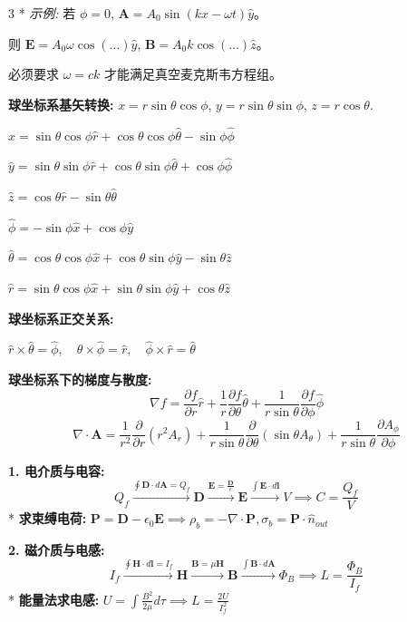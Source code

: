\documentclass[10pt,a4paper,landscape,utf8]{ctexart}
\newcommand{\p}{\partial}
\newcommand{\bs}[1]{\boldsymbol{#1}}
\begin{document}
\begin{multicols*}{3}
* \textit{示例:} 若 $\phi=0$, $\bs{A} = A_0\sin(kx-\omega t)\hat{y}$。

则 $\bs{E} = A_0\omega\cos(\dots)\hat{y}$, $\bs{B} = A_0 k\cos(\dots)\hat{z}$。

必须要求 $\omega = ck$ 才能满足真空麦克斯韦方程组。


\textbf{球坐标系基矢转换:}
$x=r\sin\theta\cos\phi$, $y=r\sin\theta\sin\phi$, $z=r\cos\theta$.

$\hat{x}= \sin\theta\cos\phi\hat{r} + \cos\theta\cos\phi\hat{\theta} - \sin\phi\hat{\phi}$

$\hat{y}= \sin\theta\sin\phi\hat{r} + \cos\theta\sin\phi\hat{\theta} + \cos\phi\hat{\phi}$

$ \hat{z} = \cos\theta \hat{r} - \sin\theta \hat{\theta} $

$\hat{\phi} = -\sin\phi\hat{x} + \cos\phi\hat{y}$

$\hat{\theta} = \cos\theta\cos\phi\hat{x} + \cos\theta\sin\phi\hat{y} - \sin\theta\hat{z}$

$\hat{r} = \sin\theta\cos\phi\hat{x} + \sin\theta\sin\phi\hat{y} + \cos\theta\hat{z}$

\textbf{球坐标系正交关系:}

$\hat{r} \times \hat{\theta} = \hat{\phi}, \quad \hat{\theta} \times \hat{\phi} = \hat{r}, \quad \hat{\phi} \times \hat{r} = \hat{\theta}$

\textbf{球坐标系下的梯度与散度:}
$$ \nabla f = \frac{\p f}{\p r}\hat{r} + \frac{1}{r}\frac{\p f}{\p \theta}\hat{\theta} + \frac{1}{r\sin\theta}\frac{\p f}{\p \phi}\hat{\phi} $$
$$ \nabla \cdot \bs{A} = \frac{1}{r^2}\frac{\p}{\p r}(r^2 A_r) + \frac{1}{r\sin\theta}\frac{\p}{\p \theta}(\sin\theta A_\theta) + \frac{1}{r\sin\theta}\frac{\p A_\phi}{\p \phi} $$

\textbf{1. 电介质与电容:}
$$ Q_f \xrightarrow{\oint \bs{D}\cdot d\bs{A} = Q_f} \bs{D} \xrightarrow{\bs{E}=\frac{\bs{D}}{\epsilon}} \bs{E} \xrightarrow{\int \bs{E}\cdot d\bs{l}} V \implies C = \frac{Q_f}{V} $$
* \textbf{求束缚电荷:} $\bs{P} = \bs{D} - \epsilon_0\bs{E} \implies \rho_b = -\nabla\cdot\bs{P}, \sigma_b = \bs{P}\cdot\hat{n}_{out}$

\textbf{2. 磁介质与电感:}
$$ I_f \xrightarrow{\oint \bs{H}\cdot d\bs{l} = I_f} \bs{H} \xrightarrow{\bs{B}=\mu\bs{H}} \bs{B} \xrightarrow{\int \bs{B}\cdot d\bs{A}} \Phi_B \implies L = \frac{\Phi_B}{I_f} $$
* \textbf{能量法求电感:} $U = \int \frac{B^2}{2\mu} d\tau \implies L = \frac{2U}{I_f^2}$


\end{multicols*}
\end{document}

